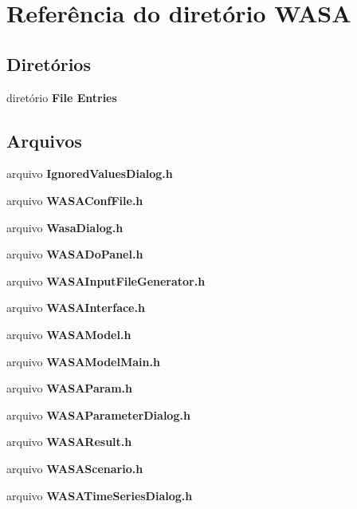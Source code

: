 \section{Referência do diretório W\+A\+SA}
\label{dir_eaed32a5c6910b78ef7bafbac9e22aee}
\subsection*{Diretórios}
\begin{DoxyCompactItemize}
\item 
diretório {\bf File Entries}
\end{DoxyCompactItemize}
\subsection*{Arquivos}
\begin{DoxyCompactItemize}
\item 
arquivo {\bf Ignored\+Values\+Dialog.\+h}
\item 
arquivo {\bf W\+A\+S\+A\+Conf\+File.\+h}
\item 
arquivo {\bf Wasa\+Dialog.\+h}
\item 
arquivo {\bf W\+A\+S\+A\+Do\+Panel.\+h}
\item 
arquivo {\bf W\+A\+S\+A\+Input\+File\+Generator.\+h}
\item 
arquivo {\bf W\+A\+S\+A\+Interface.\+h}
\item 
arquivo {\bf W\+A\+S\+A\+Model.\+h}
\item 
arquivo {\bf W\+A\+S\+A\+Model\+Main.\+h}
\item 
arquivo {\bf W\+A\+S\+A\+Param.\+h}
\item 
arquivo {\bf W\+A\+S\+A\+Parameter\+Dialog.\+h}
\item 
arquivo {\bf W\+A\+S\+A\+Result.\+h}
\item 
arquivo {\bf W\+A\+S\+A\+Scenario.\+h}
\item 
arquivo {\bf W\+A\+S\+A\+Time\+Series\+Dialog.\+h}
\end{DoxyCompactItemize}
